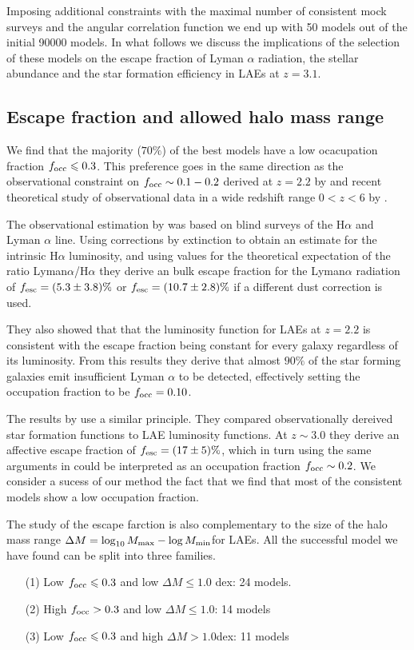 \documentclass[usenatbib]{mn2e}
\begin{document}
Imposing additional constraints with the maximal number of consistent
mock surveys and the angular correlation function we end up with 50
models out of the initial 90000 models. In what follows we discuss
the implications of the selection of these models on the escape
fraction of Lyman $\alpha$ radiation, the stellar abundance and the
star formation efficiency in LAEs at $z=3.1$. 

\subsection{Escape fraction and allowed halo mass range}

We find that the majority ($70\%$) of the best models have a low
ocacupation fraction $f_{\rm occ}\leq 0.3$. This preference goes in
the same direction as the observational constraint on $f_{\rm occ}\sim
0.1-0.2$ derived at $z=2.2$ by \cite{Hayes2010} and recent theoretical
study of observational data in a wide redshift range $0<z<6$ by
\cite{Dijkstra2013}. 

The observational estimation by \cite{Hayes2012} was based on blind
surveys of the H$\alpha$ and Lyman $\alpha$ line. Using corrections by
extinction to obtain an estimate for the intrinsic H$\alpha$
luminosity, and using values for the theoretical expectation of the
ratio Lyman$\alpha$/H$\alpha$ they derive an bulk escape fraction for
the Lyman$\alpha$ radiation of $f_{\rm esc}=(5.3\pm 3.8)\%$ or $f_{\rm
  esc}=(10.7\pm 2.8)\%$ if a different dust correction is used. 

They also showed that that the luminosity function for LAEs at $z=2.2$ is
consistent with the escape fraction being constant for every galaxy
regardless of its luminosity. From this results they derive that
almost $90\%$ of the star forming galaxies emit insufficient
Lyman $\alpha$ to be detected, effectively setting the occupation
fraction to be $f_{\rm occ}=0.10$.  

The results by \cite{Dijkstra2013} use a similar principle. They
compared observationally dereived star formation functions to LAE
luminosity functions. At $z\sim 3.0$ they derive an affective escape
fraction of $f_{\rm esc}=(17\pm 5)\%$, which in turn using the same
arguments in \cite{Hayes2010} could be interpreted as an occupation
fraction $f_{\rm occ}\sim 0.2$.  We consider a sucess of our method
the fact that we find that most of the consistent models show a low
occupation fraction.   

The study of the escape farction is also complementary to the size of
the halo mass range $\Delta M=\log_{10}M_{\rm max} - \log M_{\rm
  min}$for LAEs. All the successful model we have found can be 
split into three families. 
\begin{itemize}
\item[(1)] Low $f_{\rm occ}\leq 0.3$ and low $\Delta M\leq 1.0$
  dex: 24 models.
\item[(2)] High $f_{\rm occ}> 0.3$ and low $\Delta M\leq 1.0$: 14 models
\item[(3)] Low $f_{\rm occ}\leq 0.3$ and high $\Delta M > 1.0$dex: 11
  models
\end{itemize}
\end{document}
